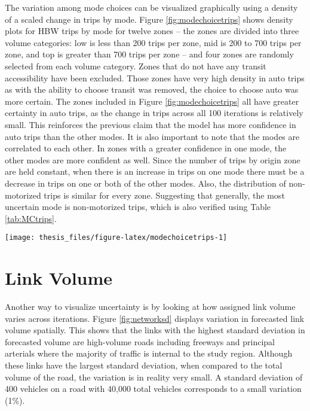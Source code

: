 \documentclass[fancy, masters,twoside]{byuthesis}
\begin{document}
The variation among mode choices can be visualized graphically using a density of a scaled change in trips by mode. Figure \ref{fig:modechoicetrips} shows density plots for HBW trips by mode for twelve zones -- the zones are divided into three volume categories: low is less than 200 trips per zone, mid is 200 to 700 trips per zone, and top is greater than 700 trips per zone -- and four zones are randomly selected from each volume category. Zones that do not have any transit accessibility have been excluded. Those zones have very high density in auto trips as with the ability to choose transit was removed, the choice to choose auto was more certain. The zones included in Figure \ref{fig:modechoicetrips} all have greater certainty in auto trips, as the change in trips across all 100 iterations is relatively small. This reinforces the previous claim that the model has more confidence in auto trips than the other modes. It is also important to note that the modes are correlated to each other. In zones with a greater confidence in one mode, the other modes are more confident as well. Since the number of trips by origin zone are held constant, when there is an increase in trips on one mode there must be a decrease in trips on one or both of the other modes. Also, the distribution of non-motorized trips is similar for every zone. Suggesting that generally, the most uncertain mode is non-motorized trips, which is also verified using Table \ref{tab:MCtrips}.

\begin{sidewaysfigure}

{\centering \texttt{[image: thesis\_files/figure-latex/modechoicetrips-1]} 

}

\caption{Trip desnity for coefficient of variation by mode for HBW trips.}\label{fig:modechoicetrips}
\end{sidewaysfigure}

\hypertarget{link-volume}{%
\section{Link Volume}\label{link-volume}}

Another way to visualize uncertainty is by looking at how assigned link volume varies across iterations. Figure \ref{fig:networksd} displays variation in forecasted link volume spatially. This shows that the links with the highest standard deviation in forecasted volume are high-volume roads including freeways and principal arterials where the majority of traffic is internal to the study region. Although these links have the largest standard deviation, when compared to the total volume of the road, the variation is in reality very small. A standard deviation of 400 vehicles on a road with 40,000 total vehicles corresponds to a small variation (1\%).
\end{document}
